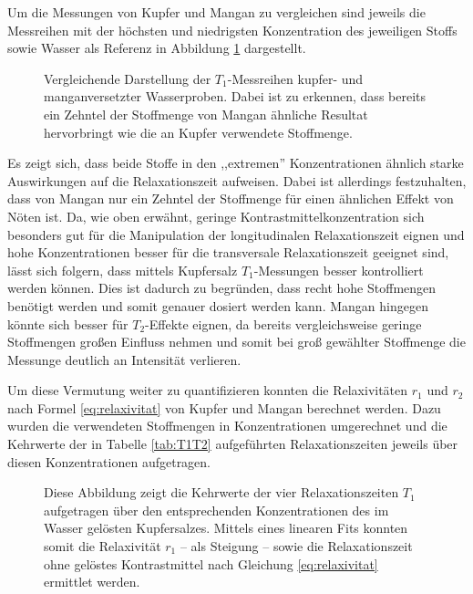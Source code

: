 Um die Messungen von Kupfer und Mangan zu vergleichen sind jeweils die Messreihen mit der höchsten und niedrigsten Konzentration des jeweiligen Stoffs sowie Wasser als Referenz in Abbildung \ref{fig:T1CuMn} dargestellt. 

\begin{figure}[H]
    \centering
    
    \caption[Vergleichende Darstellung der $T_1$-Messreihen kupfer- und manganversetzter Wasserproben.]{Vergleichende Darstellung der $T_1$-Messreihen kupfer- und manganversetzter Wasserproben. Dabei ist zu erkennen, dass bereits ein Zehntel der Stoffmenge von Mangan ähnliche Resultat hervorbringt wie die an Kupfer verwendete Stoffmenge.}
    \label{fig:T1CuMn}
\end{figure}

Es zeigt sich, dass beide Stoffe in den ,,extremen'' Konzentrationen ähnlich starke Auswirkungen auf die Relaxationszeit aufweisen.
Dabei ist allerdings festzuhalten, dass von Mangan nur ein Zehntel der Stoffmenge für einen ähnlichen Effekt von Nöten ist.
Da, wie oben erwähnt, geringe Kontrastmittelkonzentration sich besonders gut für die Manipulation der longitudinalen Relaxationszeit eignen und hohe Konzentrationen besser für die transversale Relaxationszeit geeignet sind, lässt sich folgern, dass mittels Kupfersalz $T_1$-Messungen besser kontrolliert werden können.
Dies ist dadurch zu begründen, dass recht hohe Stoffmengen benötigt werden und somit genauer dosiert werden kann.
Mangan hingegen könnte sich besser für $T_2$-Effekte eignen, da bereits vergleichsweise geringe Stoffmengen großen Einfluss nehmen und somit bei groß gewählter Stoffmenge die Messunge deutlich an Intensität verlieren.

Um diese Vermutung weiter zu quantifizieren konnten die Relaxivitäten $r_1$ und $r_2$ nach Formel \eqref{eq:relaxivitat} von Kupfer und Mangan berechnet werden.
Dazu wurden die verwendeten Stoffmengen in Konzentrationen umgerechnet und die Kehrwerte der in Tabelle \ref{tab:T1T2} aufgeführten Relaxationszeiten jeweils über diesen Konzentrationen aufgetragen.

\begin{figure}[H]
    \centering
    
    \caption[Linearer Fit zur Ermittlung der Relaxivität $r_1$ von Kupfer.]{Diese Abbildung zeigt die Kehrwerte der vier Relaxationszeiten $T_1$ aufgetragen über den entsprechenden Konzentrationen des im Wasser gelösten Kupfersalzes. Mittels eines linearen Fits konnten somit die Relaxivität $r_1$ -- als Steigung -- sowie die Relaxationszeit ohne gelöstes Kontrastmittel nach Gleichung \eqref{eq:relaxivitat} ermittlet werden.}
    \label{fig:RelaxCUT1}
\end{figure}

